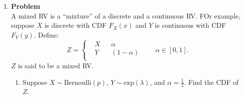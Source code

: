 \documentclass[12pt]{article}
\newenvironment{Ex}{\textbf{Problem}\vspace{.75em}\\}{}
\begin{document}
\begin{enumerate}
\begin{Ex}
    \begin{equation}
      \label{eq:5-question}
      f_Y(y) =
      \frac{1}{\sqrt{2\pi\sigma^2}}e^{-\frac{(y-\mu)^2}{2\sigma^2}}
      \quad\text{for }-\infty < y < \infty
    \end{equation}
    then $X$ is said to have a log normal distrubtion with parameters
    $\mu$, $\sigma^2$, denoted $X \sim
    \text{Lognormal}(\mu,\sigma^2)$. Determine the PDF of $X$.
    \begin{solution} \hfill \\\\ {\huge TODO}
    \end{solution}
  \end{Ex}
\item 
  \begin{Ex}
    A mixed RV is a ``mixture'' of a discrete and a continuous RV. FOr
    example, suppose $X$ is discrete with CDF $F_X(x)$ and $Y$ is
    continuous with CDF $F_Y(y)$. Define:
    \begin{equation}
      \label{eq:6-question}
      Z = \left\{
        \begin{aligned}
          & X && \alpha \\
          & Y && (1-\alpha) \\
        \end{aligned} \right.
      \quad\quad\alpha \in [0,1].
    \end{equation}
    $Z$ is said to be a mixed RV.
    \begin{enumerate}
    \item Suppose $X \sim \text{Bernoulli}(p)$, $Y\sim
      \text{exp}(\lambda)$, and $\alpha=\frac{1}{2}$. Find the CDF of
      $Z$.


\end{enumerate}
\end{Ex}
\end{enumerate}
\end{document}
